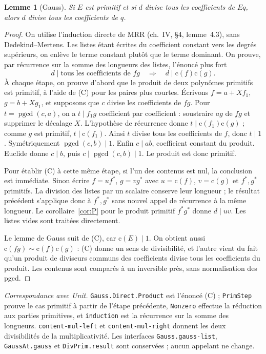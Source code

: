 \documentclass[11pt]{amsart}
\newtheorem{lemma}[theorem]{Lemme}
\theoremstyle{definition}
\theoremstyle{remark}
\newcommand{\pgcd}{\operatorname{pgcd}}
\newcommand{\cont}{\mathrm c}
\begin{document}
\begin{lemma}[Gauss]\label{lem:gauss}
Si $E$ est primitif et si $d$ divise tous les coefficients de $Eq$, alors
$d$ divise tous les coefficients de $q$.
\end{lemma}
\begin{proof}
On utilise l'induction directe de MRR
(ch.~IV, \S4, lemme~4.3), sans Dedekind--Mertens. Les listes étant
écrites du coefficient constant vers les degrés supérieurs, on enlève
le terme constant plutôt que le terme dominant. On prouve, par
récurrence sur la somme des longueurs des listes, l'énoncé plus fort
\[
 d\mid\text{tous les coefficients de }fg
 \quad\Longrightarrow\quad d\mid\cont(f)\cont(g). \tag{C}
\]
À chaque étape, on prouve d'abord que le produit de deux polynômes
primitifs est primitif, à l'aide de (C) pour les paires plus courtes.
Écrivons $f=a+Xf_1$, $g=b+Xg_1$, et supposons que $c$ divise les
coefficients de $fg$. Pour $t=\pgcd(c,a)$, on a
$t\mid f_1g$ coefficient par coefficient : soustraire $ag$ de $fg$
et supprimer le décalage $X$. L'hypothèse de récurrence donne
$t\mid\cont(f_1)\cont(g)$ ; comme $g$ est primitif, $t\mid\cont(f_1)$.
Ainsi $t$ divise tous les coefficients de $f$, donc $t\mid1$.
Symétriquement $\pgcd(c,b)\mid1$. Enfin $c\mid ab$, coefficient
constant du produit. Euclide donne $c\mid b$, puis
$c\mid\pgcd(c,b)\mid1$. Le produit est donc primitif.

Pour établir (C) à cette même étape, si l'un des contenus est nul,
la conclusion est immédiate. Sinon écrire $f=uf^*$, $g=vg^*$ avec
$u=\cont(f)$, $v=\cont(g)$ et $f^*,g^*$ primitifs. La division des
listes par un scalaire conserve leur longueur ; le résultat précédent
s'applique donc à $f^*,g^*$ sans nouvel appel de récurrence à la même
longueur. Le corollaire~\ref{cor:P} pour le produit primitif $f^*g^*$
donne $d\mid uv$. Les listes vides sont traitées directement.

Le lemme de Gauss suit de (C), car $\cont(E)\mid1$. On obtient aussi
$\cont(fg)\sim\cont(f)\cont(g)$ : (C) donne un sens de divisibilité,
et l'autre vient du fait qu'un produit de diviseurs communs des
coefficients divise tous les coefficients du produit. Les contenus
sont comparés à un inversible près, sans normalisation des pgcd.
\end{proof}

\noindent\emph{Correspondance avec Unit.}
\texttt{Gauss.Direct.Product} est l'énoncé (C) ;
\texttt{PrimStep} prouve le cas primitif à partir de l'étape précédente,
\texttt{Nonzero} effectue la réduction aux parties primitives, et
\texttt{induction} est la récurrence sur la somme des longueurs.
\texttt{content-mul-left} et \texttt{content-mul-right} donnent les deux
divisibilités de la multiplicativité. Les interfaces
\texttt{Gauss.gauss-list}, \texttt{GaussAt.gauss} et
\texttt{DivPrim.result} sont conservées ; aucun appelant ne change.
\end{document}
